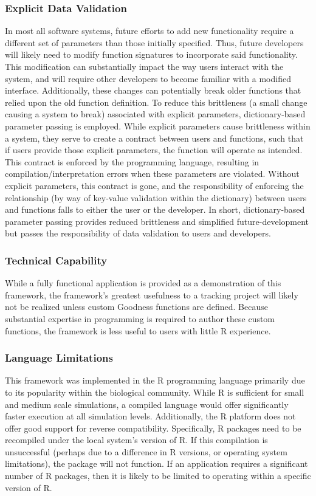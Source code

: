 \subsubsection{Explicit Data Validation}
In most all software systems, future efforts to add new functionality require a different set of parameters than those initially specified.  Thus, future developers will likely need to modify function signatures to incorporate said functionality.  This modification can substantially impact the way users interact with the system, and will require other developers to become familiar with a modified interface.  Additionally, these changes can potentially break older functions that relied upon the old function definition.  To reduce this brittleness (a small change causing a system to break) associated with explicit parameters, dictionary-based parameter passing is employed.  While explicit parameters cause brittleness within a system, they serve to create a contract between users and functions, such that if users provide those explicit parameters, the function will operate as intended.  This contract is enforced by the programming language, resulting in compilation/interpretation errors when these parameters are violated.  Without explicit parameters, this contract is gone, and the responsibility of enforcing the relationship (by way of key-value validation within the dictionary) between users and functions falls to either the user or the developer.  In short, dictionary-based parameter passing provides reduced brittleness and simplified future-development but passes the responsibility of data validation to users and developers.

\subsubsection{Technical Capability}
While a fully functional application is provided as a demonstration of this framework, the framework's greatest usefulness to a tracking project will likely not be realized unless custom Goodness functions are defined.  Because substantial expertise in programming is required to author these custom functions, the framework is less useful to users with little R experience.  

\subsubsection{Language Limitations}
This framework was implemented in the R programming language primarily due to its popularity within the biological community.  While R is sufficient for small and medium scale simulations, a compiled language would offer significantly faster execution at all simulation levels.  Additionally, the R platform does not offer good support for reverse compatibility.  Specifically, R packages need to be recompiled under the local system's version of R.  If this compilation is unsuccessful (perhaps due to a difference in R versions, or operating system limitations), the package will not function.  If an application requires a significant number of R packages, then it is likely to be limited to operating within a specific version of R.

